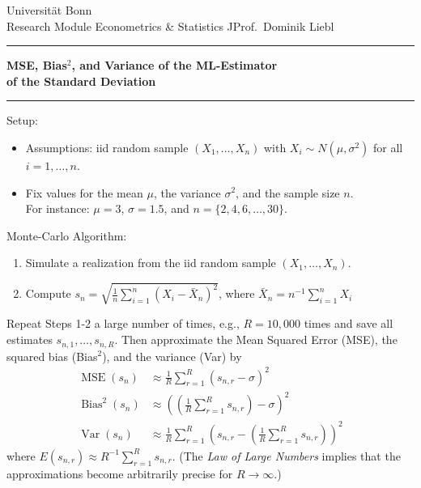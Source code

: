 \documentclass[a4paper]{article}
\begin{document}
Universität Bonn \hfill   \\%
Research Module Econometrics \& Statistics \hfill JProf.~Dominik Liebl
\rule{\textwidth}{.2pt}
\begin{center} 
\textbf{{\large MSE, Bias$^2$, and Variance of the ML-Estimator\\of the Standard Deviation}}\\[1ex]
\end{center}
\rule{\textwidth}{.2pt}


{\sc Setup: }
\begin{itemize}[leftmargin=0.3cm]
\item Assumptions: iid random sample $(X_1,\dots,X_n)$ with $X_i\sim N(\mu,\sigma^2)$ for all $i=1,\dots,n$.
\item Fix values for the mean $\mu$, the variance $\sigma^2$, and the sample size $n$. \\
For instance: $\mu=3$, $\sigma=1.5$, and $n=\{2,4,6,\dots,30\}$.
\end{itemize}

{\sc Monte-Carlo Algorithm:}
\begin{enumerate}
\item Simulate a realization from the iid random sample $(X_1,\dots,X_n)$.
\item Compute $s_n=\sqrt{\frac{1}{n}\sum_{i=1}^n(X_i-\bar{X}_n)^2}$, where $\bar{X}_n=n^{-1}\sum_{i=1}^nX_i$
\end{enumerate}

Repeat Steps 1-2 a large number of times, e.g., $R=10,000$ times and save all estimates $s_{n,1},\dots,s_{n,R}$. Then approximate the Mean Squared Error (MSE), the squared bias (Bias$^2$), and the variance (Var) by
\begin{align*}
\operatorname{MSE}(s_n)   &\approx \frac{1}{R}\sum_{r=1}^R (s_{n,r}-\sigma)^2\\
\operatorname{Bias}^2(s_n)&\approx \left(\left(\frac{1}{R}\sum_{r=1}^R s_{n,r}\right)-\sigma\right)^2\\
\operatorname{Var}(s_n)&\approx\frac{1}{R}\sum_{r=1}^R \left(s_{n,r}-\left(\frac{1}{R}\sum_{r=1}^R s_{n,r}\right)\right)^2
\end{align*}
where $E(s_{n,r})\approx R^{-1}\sum_{r=1}^Rs_{n,r}$. (The \textit{Law of Large Numbers} implies that the approximations become arbitrarily precise for $R\to\infty$.)
\end{document}
